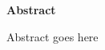 \begin{center}
	\fontsize{20}{15}\selectfont \textbf{Abstract}
\end{center}

\quad Abstract goes here